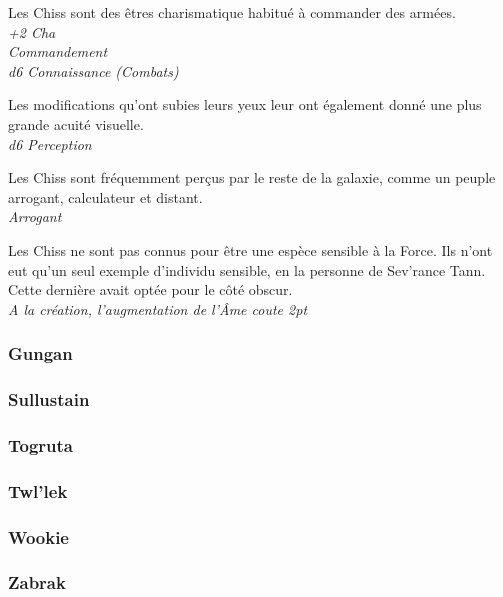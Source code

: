 \begin{description}[align=left]
\item [Charismatique] 			%
		Les Chiss sont des êtres charismatique habitué à commander des armées.\\
		\emph{+2 Cha}\\
		\emph{Commandement}\\
		\emph{d6 Connaissance (Combats)}
\item [Aquité visuelle] 		%
		Les modifications qu’ont subies leurs yeux leur ont également donné une plus grande acuité visuelle.\\
		\emph{d6 Perception}
\item [Arrogant] 				%
		Les Chiss sont fréquemment perçus par le reste de la galaxie, comme un peuple arrogant, calculateur et distant.\\
		\emph{Arrogant}
\item [Insensible à la Force] 		%
		Les Chiss ne sont pas connus pour être une espèce sensible à la Force. Ils n’ont eut qu’un seul exemple d’individu sensible, en la personne de Sev’rance Tann. Cette dernière avait optée pour le côté obscur.\\
		\emph{A la création, l'augmentation de l'\^Ame coute 2pt}
\end{description}

\subsubsection{Gungan}
\subsubsection{Sullustain}
\subsubsection{Togruta}
\subsubsection{Twl'lek}
\subsubsection{Wookie}
\subsubsection{Zabrak}

\newpage %

